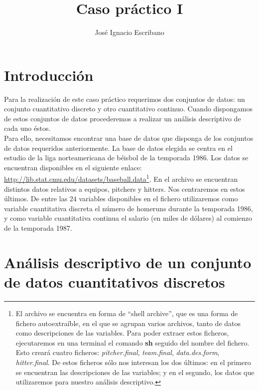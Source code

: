 \documentclass[12pt,a4paper,twoside,openright,titlepage,final]{article}
\author{José Ignacio Escribano}
\title{Caso práctico I}
\begin{document}
\setcounter{page}{1}


\listoffigures
\thispagestyle{empty}
\newpage

\tableofcontents
\thispagestyle{empty}
\newpage


\setcounter{page}{1}

\section{Introducción}

Para la realización de este caso práctico requerimos dos conjuntos de datos: un conjunto cuantitativo discreto y otro cuantitativo continuo. Cuando dispongamos de estos conjuntos de datos procederemos a realizar un análisis descriptivo de cada uno éstos.\\

Para ello, necesitamos encontrar una base de datos que disponga de los conjuntos de datos requeridos anteriormente. La base de datos elegida se centra en el estudio de la liga norteamericana de béisbol de la temporada 1986. Los datos se encuentran disponibles en el siguiente enlace: \url{http://lib.stat.cmu.edu/datasets/baseball.data}\footnote{El archivo se encuentra en forma de ``shell archive'', que es una forma de fichero autoextraíble, en el que se agrupan varios archivos, tanto de datos como descripciones de las variables. Para poder extraer estos ficheros, ejecutaremos en una terminal el comando \textbf{sh} seguido del nombre del fichero. Esto creará cuatro ficheros: \textit{pitcher.final}, \textit{team.final}, \textit{data.des.form}, \textit{hitter.final}. De estos ficheros sólo nos interesan los dos últimos: en el primero se encuentran las descripciones de las variables; y en el segundo, los datos que utilizaremos para nuestro análisis descriptivo.}. En el archivo se encuentran distintos datos relativos a equipos, pitchers y hitters. Nos centraremos en estos últimos. De entre las $24$ variables disponibles en el fichero utilizaremos como variable cuantitativa discreta el número de homeruns durante la temporada 1986, y como variable cuantitativa continua el salario (en miles de dólares) al comienzo de la temporada 1987.  

\section{Análisis descriptivo de un conjunto de datos cuantitativos discretos}
\end{document}
